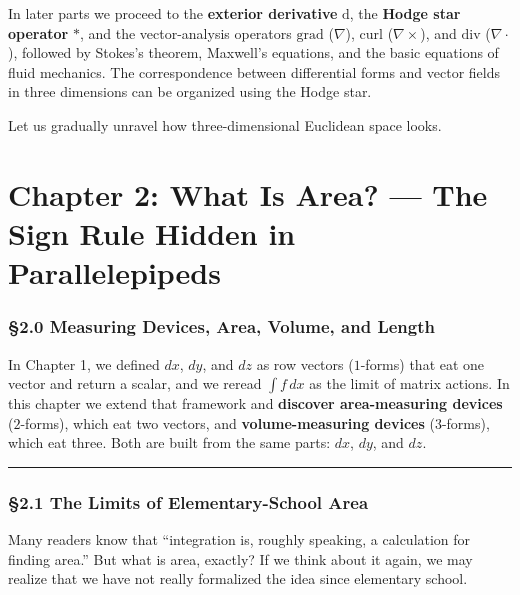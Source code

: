 In later parts we proceed to the \textbf{exterior derivative}
\(\mathrm{d}\), the \textbf{Hodge star operator} \(\ast\), and the
vector-analysis operators \(\mathrm{grad}\) (\(\nabla\)),
\(\mathrm{curl}\) (\(\nabla\times\)), and \(\mathrm{div}\)
(\(\nabla\cdot\)), followed by Stokes's theorem, Maxwell's equations,
and the basic equations of fluid mechanics. The correspondence between
differential forms and vector fields in three dimensions can be
organized using the Hodge star.

Let us gradually unravel how three-dimensional Euclidean space looks.

\newpage

\hypertarget{chapter-2-what-is-area-the-sign-rule-hidden-in-parallelepipeds}{%
\chapter{Chapter 2: What Is Area? --- The Sign Rule Hidden in
Parallelepipeds}\label{chapter-2-what-is-area-the-sign-rule-hidden-in-parallelepipeds}}

\hypertarget{measuring-devices-area-volume-and-length}{%
\subsection{§2.0 Measuring Devices, Area, Volume, and
Length}\label{measuring-devices-area-volume-and-length}}

In Chapter 1, we defined \(dx\), \(dy\), and \(dz\) as row vectors
(\(1\)-forms) that eat one vector and return a scalar, and we reread
\(\int f\,dx\) as the limit of matrix actions. In this chapter we extend
that framework and \textbf{discover area-measuring devices}
(\(2\)-forms), which eat two vectors, and
\textbf{volume-measuring devices} (\(3\)-forms), which eat three. Both
are built from the same parts: \(dx\), \(dy\), and \(dz\).

\begin{center}\rule{0.5\linewidth}{0.5pt}\end{center}

\hypertarget{the-limits-of-elementary-school-area}{%
\subsection{§2.1 The Limits of Elementary-School
Area}\label{the-limits-of-elementary-school-area}}

Many readers know that ``integration is, roughly speaking, a calculation
for finding area.'' But what is area, exactly? If we think about it
again, we may realize that we have not really formalized the idea since
elementary school.

